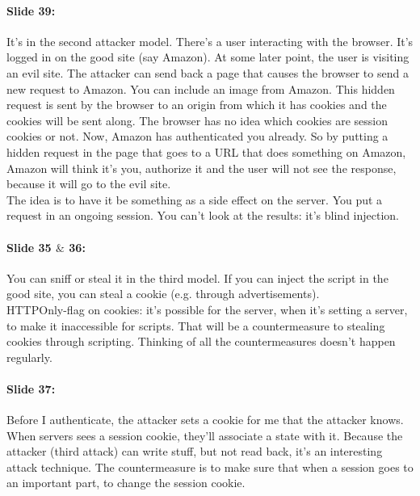 \documentclass[10pt,a4paper]{report}
\begin{document}
\paragraph{Slide 39:} It's in the second attacker model. There's a user interacting with the browser. It's logged in on the good site (say Amazon). At some later point, the user is visiting an evil site. The attacker can send back a page that causes the browser to send a new request to Amazon. You can include an image from Amazon. This hidden request is sent by the browser to an origin from which it has cookies and the cookies will be sent along. The browser has no idea which cookies are session cookies or not. Now, Amazon has authenticated you already. So by putting a hidden request in the page that goes to a URL that does something on Amazon, Amazon will think it's you, authorize it and the user will not see the response, because it will go to the evil site.\\
The idea is to have it be something as a side effect on the server. You put a request in an ongoing session. You can't look at the results: it's blind injection. 

\paragraph{Slide 35 $\&$ 36:} You can sniff or steal it in the third model. If you can inject the script in the good site, you can steal a cookie (e.g. through advertisements). \\
HTTPOnly-flag on cookies: it's possible for the server, when it's setting a server, to make it inaccessible for scripts. That will be a countermeasure to stealing cookies through scripting. 
Thinking of all the countermeasures doesn't happen regularly. 

\paragraph{Slide 37:} Before I authenticate, the attacker sets a cookie for me that the attacker knows. When servers sees a session cookie, they'll associate a state with it. Because the attacker (third attack) can write stuff, but not read back, it's an interesting attack technique. The countermeasure is to make sure that when a session goes to an important part, to change the session cookie. 
\end{document}
